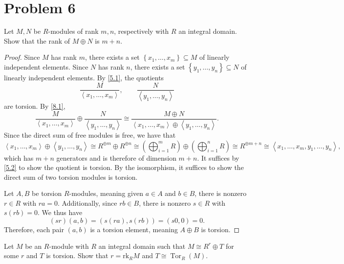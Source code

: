 \documentclass[11pt, letterpaper]{article}
\begin{document}
\section{Problem 6}
\begin{problem}
	Let $M,N$ be $R$-modules of rank $m,n$, respectively with $R$ an integral domain. Show that the rank of $M\oplus N$ is $m+n$.
\end{problem}
\begin{proof}
	Since $M$ has rank $m$, there exists a set $\left\{ x_1, \ldots ,x_m \right\} \subseteq M$ of linearly independent elements. Since $N$ has rank $n$, there exists a set $\left\{ y_1, \ldots ,y_n \right\} \subseteq N$ of linearly independent elements. By \cref{5.1}, the quotients
	\[
		\frac{M}{\left\langle x_1, \ldots ,x_m \right\rangle } ,\qquad \frac{N}{\left\langle y_1, \ldots ,y_n \right\rangle } 
	\]
	are torsion. By \cref{8.1},
	\[
		\frac{M}{\left\langle x_1, \ldots ,x_m \right\rangle } \oplus \frac{N}{\left\langle y_1 , \ldots ,y_n \right\rangle } \cong \frac{M\oplus N}{\left\langle x_1, \ldots ,x_m\right\rangle\oplus \left\langle y_1, \ldots ,y_n \right\rangle } 
	.\]
	Since the direct sum of free modules is free, we have that
	\[
		\left\langle x_1, \ldots ,x_m \right\rangle \oplus \left\langle y_1, \ldots ,y_n \right\rangle \cong R ^{\oplus m} \oplus R ^{\oplus n} \cong \left( \bigoplus_{i=1} ^mR \right) \oplus \left( \bigoplus_{i=1} ^nR \right) \cong R^{\oplus m+n} \cong \left\langle x_1, \ldots ,x_m,y_1, \ldots ,y_n \right\rangle ,
	\]
	which has $m+n$ generators and is therefore of dimension $m+n$.	It suffices by \cref{5.2} to show the quotient is torsion. By the isomorphism, it suffices to show the direct sum of two torsion modules is torsion.

	Let $A,B$ be torsion $R$-modules, meaning given $a\in A$ and $b\in B$, there is nonzero $r\in R $ with $ra=0$. Additionally, since $rb\in B$, there is nonzero $s\in R$ with $s(rb)=0$. We thus have
	\[
		(sr)(a,b) = (s(ra),s(rb)) = (s0,0)=0
	.\]
	Therefore, each pair $(a,b)$ is a torsion element, meaning $A\oplus B$ is torsion.
\end{proof}
\begin{problem}
	Let $M$ be an $R$-module with $R$ an integral domain such that $M\cong R^r\oplus T$ for some $r$ and $T$ is torsion. Show that $r =\mathrm{rk} _RM$ and $T\cong \operatorname{Tor}_R (M)$.
\end{problem}
\end{document}
